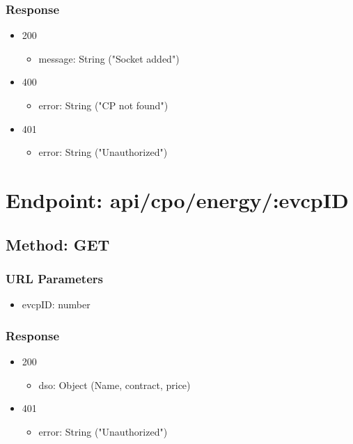\subsubsection*{Response}
\begin{itemize}
    \item 200
          \begin{itemize}
              \item message: String ("Socket added")
          \end{itemize}
    \item 400
          \begin{itemize}
              \item error: String ("CP not found")
          \end{itemize}
    \item 401
          \begin{itemize}
              \item error: String ("Unauthorized")
          \end{itemize}
\end{itemize}

\section*{Endpoint: api/cpo/energy/:evcpID}
\subsection*{Method: GET}
\subsubsection*{URL Parameters}
\begin{itemize}
    \item evcpID: number
\end{itemize}
\subsubsection*{Response}
\begin{itemize}
    \item 200
          \begin{itemize}
              \item dso: Object (Name, contract, price)
          \end{itemize}
    \item 401
          \begin{itemize}
              \item error: String ("Unauthorized")
          \end{itemize}
\end{itemize}

